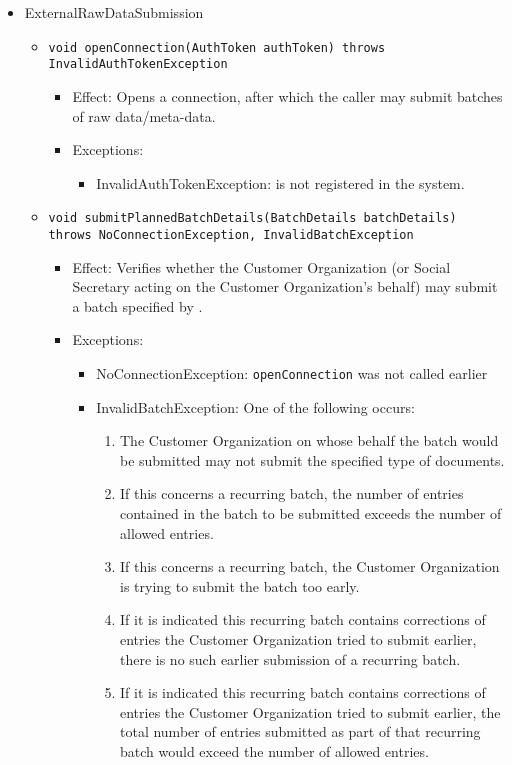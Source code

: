 \begin{itemize}
	\item ExternalRawDataSubmission
	\begin{itemize}
		\item \texttt{void openConnection(AuthToken authToken) throws InvalidAuthTokenException}
		\begin{itemize}
			\item Effect: Opens a connection, after which the caller may submit batches of raw data/meta-data.
			\item Exceptions:
			\begin{itemize}
				\item InvalidAuthTokenException:  is not registered in the system.
			\end{itemize}
		\end{itemize}
		
		\item \texttt{void submitPlannedBatchDetails(BatchDetails batchDetails) throws NoConnectionException, InvalidBatchException}
		\begin{itemize}
			\item Effect: Verifies whether the Customer Organization (or Social Secretary acting on the Customer Organization's behalf) may submit a batch specified by .
			\item Exceptions:
			\begin{itemize}
				\item NoConnectionException: \texttt{openConnection} was not called earlier
				\item InvalidBatchException: One of the following occurs:
				\begin{enumerate}
					\item The Customer Organization on whose behalf the batch would be submitted may not submit the specified type of documents.
					\item If this concerns a recurring batch, the number of entries contained in the batch to be submitted exceeds the number of allowed entries.
					\item If this concerns a recurring batch, the Customer Organization is trying to submit the batch too early.
					\item If it is indicated this recurring batch contains corrections of entries the Customer Organization tried to submit earlier, there is no such earlier submission of a recurring batch.
					\item If it is indicated this recurring batch contains corrections of entries the Customer Organization tried to submit earlier, the total number of entries submitted as part of that recurring batch would exceed the number of allowed entries.
				\end{enumerate}
			\end{itemize}
		\end{itemize}
		

\end{itemize}
\end{itemize}
